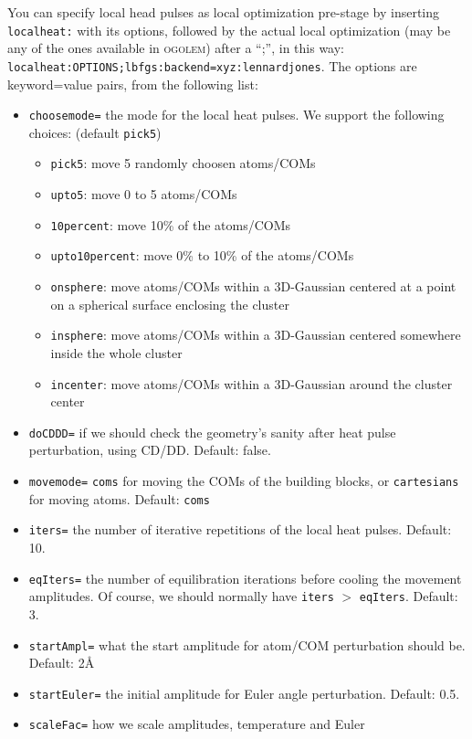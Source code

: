 \documentclass[a4paper,10pt]{scrbook}
\newcommand{\ogo}{\textsc{ogolem}}
\begin{document}
You can specify local head pulses as local optimization pre-stage by inserting
\texttt{localheat:} with its options, followed by the actual local
optimization (may be any of  
the ones available in \ogo{}) after a ``;'', in this way:
\texttt{localheat:OPTIONS;lbfgs:backend=xyz:lennardjones}. The options  
are keyword=value pairs, from the following list:
\begin{itemize}
 \item \texttt{choosemode=} the mode for the local heat pulses. We support
   the following choices: (default \texttt{pick5})
   \begin{itemize}
   \item \texttt{pick5}: move 5 randomly choosen atoms/COMs
   \item \texttt{upto5}: move 0 to 5 atoms/COMs
   \item \texttt{10percent}: move 10\% of the atoms/COMs
   \item \texttt{upto10percent}: move 0\% to 10\% of the atoms/COMs
   \item \texttt{onsphere}: move atoms/COMs within a 3D-Gaussian centered at a
     point on a spherical surface enclosing the cluster
   \item \texttt{insphere}: move atoms/COMs within a 3D-Gaussian centered
     somewhere inside the whole cluster
   \item \texttt{incenter}: move atoms/COMs within a 3D-Gaussian around the
     cluster center
   \end{itemize}
\item \texttt{doCDDD=} if we should check the geometry's sanity after
  heat pulse perturbation, using CD/DD. Default: false.
\item \texttt{movemode=} \texttt{coms} for moving the COMs of the building
  blocks, or \texttt{cartesians} for moving atoms. Default: \texttt{coms}
\item \texttt{iters=} the number of iterative repetitions of the local heat
  pulses. Default: 10. 
\item \texttt{eqIters=} the number of equilibration iterations before cooling
  the movement amplitudes. Of course, we should normally have \texttt{iters}
  $>$ \texttt{eqIters}. Default: 3.
\item \texttt{startAmpl=} what the start amplitude for atom/COM
  perturbation should be. Default: 2\AA{}
\item \texttt{startEuler=} the initial amplitude for Euler angle
  perturbation. Default: 0.5.
\item \texttt{scaleFac=} how we scale amplitudes, temperature and Euler

\end{itemize}
\end{document}

